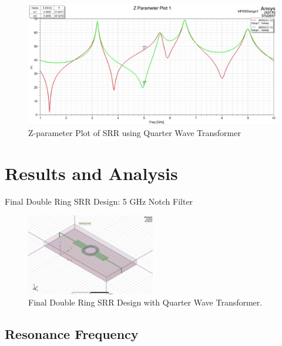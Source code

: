 \documentclass[conference]{IEEEtran}
\begin{document}
\begin{figure}[h]
    \centering
    \includegraphics[width=1\linewidth]{Images/WhatsApp Image 2025-05-06 at 06.32.06_5ce3b829.jpg}
    \caption{Z-parameter Plot of SRR using Quarter Wave Transformer }
\end{figure}


\section{Results and Analysis}
Final Double Ring SRR Design: 5 GHz Notch Filter
\begin{figure}[h]
\centering
    \includegraphics[width=0.5\textwidth]{Images/final_double_ring_srr.jpg}
    \caption{Final Double Ring SRR Design with Quarter Wave Transformer.}
\end{figure}
\subsection{Resonance Frequency}
\end{document}
